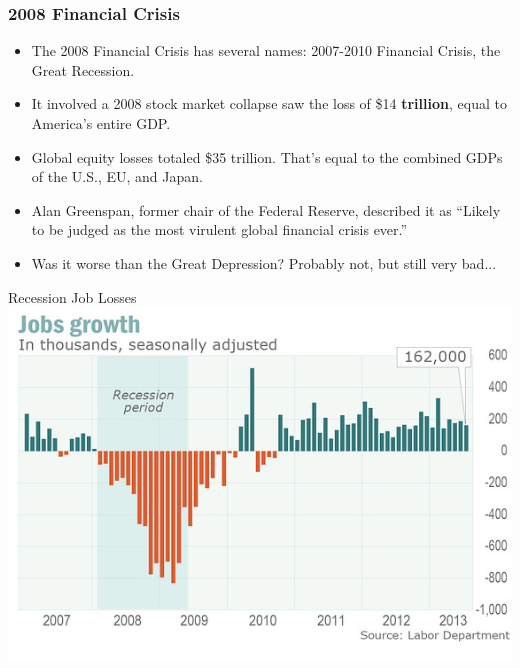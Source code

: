 \documentclass{beamer}
\begin{document}
\begin{frame} 
	\frametitle{\LARGE{2008 Financial Crisis}}
	\begin{itemize}
		\item The 2008 Financial Crisis has several names: 2007-2010 Financial Crisis, the Great Recession. \pause
		\item It involved a 2008 stock market collapse saw the loss of \$14 \textbf{trillion}, equal to America's entire GDP. \pause
		\item Global equity losses totaled \$35 trillion. That's equal to the combined GDPs of the U.S., EU, and Japan. \pause
		\item Alan Greenspan, former chair of the Federal Reserve, described it as “Likely to be judged as the most virulent global financial crisis ever.” \pause
		\item Was it worse than the Great Depression? Probably not, but still very bad...	
	\end{itemize}
\end{frame}


\begin{frame}{\LARGE Recession Job Losses}
	\centering
	\includegraphics[width=\textwidth,height=.8\textheight,keepaspectratio]{jobgrowth.png}
\end{frame}
\end{document}

